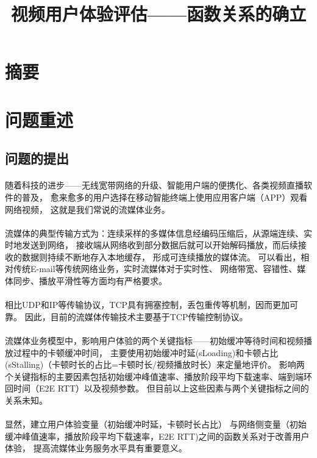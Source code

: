 \documentclass[UTF8]{ctexart}
\title{视频用户体验评估——函数关系的确立}
\begin{document}
\maketitle
\section{摘要}
\section{问题重述}
\subsection{问题的提出}
\paragraph{}
随着科技的进步——无线宽带网络的升级、智能用户端的便携化、各类视频直播软件的普及，
愈来愈多的用户选择在移动智能终端上使用应用客户端（APP）观看网络视频，
这就是我们常说的流媒体业务。
\paragraph{}
流媒体的典型传输方式为：连续采样的多媒体信息经编码压缩后，从源端连续、实时地发送到网络， 
接收端从网络收到部分数据后就可以开始解码播放，而后续接 收的数据则持续不断地存入本地缓存，
形成可连续播放的媒体流。\cite{1}
可以看出，相对传统E-mail等传统网络业务，实时流媒体对于实时性、 网络带宽、容错性、媒体同步、播放平滑性等方面均有严格要求。
\paragraph{}
相比UDP和IP等传输协议，TCP具有拥塞控制，丢包重传等机制，因而更加可靠。
因此，目前的流媒体传输技术主要基于TCP传输控制协议。
\paragraph{}
流媒体业务模型中，影响用户体验的两个关键指标——初始缓冲等待时间和视频播放过程中的卡顿缓冲时间，
主要使用初始缓冲时延(sLoading)和卡顿占比(sStalling)（卡顿时长的占比=卡顿时长/视频播放时长）来定量地评价。
影响两个关键指标的主要因素包括初始缓冲峰值速率、播放阶段平均下载速率、端到端环回时间（E2E RTT）以及视频参数。
但目前以上这些因素与两个关键指标之间的关系未知。
\paragraph{}
显然，建立用户体验变量（初始缓冲时延，卡顿时长占比）
与网络侧变量（初始缓冲峰值速率，播放阶段平均下载速率，E2E RTT)之间的函数关系对于改善用户体验，
提高流媒体业务服务水平具有重要意义。
\end{document}
